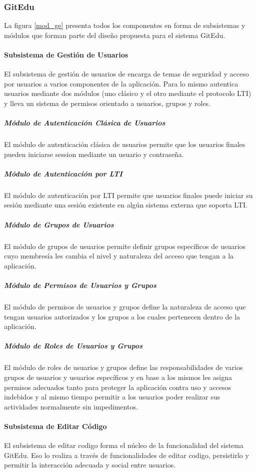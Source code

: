 \subsubsection{GitEdu}

La figura \ref{mod_ge} presenta todos los componentes en forma de subsistemas y módulos que forman parte del diseño propuesta para el sistema GitEdu.

\paragraph{Subsistema de Gestión de Usuarios}
El subsistema de gestión de usuarios de encarga de temas de seguridad y acceso por usuarios a varios componentes de la aplicación. Para lo mismo autentica usuarios mediante dos módulos (uno clásico y el otro mediante el protocolo LTI) y lleva un sistema de permisos orientado a usuarios, grupos y roles.

\subparagraph{Módulo de Autenticación Clásica de Usuarios}
El módulo de autenticación clásica de usuarios permite que los usuarios finales pueden iniciarse session mediante un usuario y contraseña.

\subparagraph{Módulo de Autenticación por LTI}
El módulo de autenticación por LTI permite que usuarios finales puede iniciar su sesión mediante una sesión existente en algún sistema externa que soporta LTI.

\subparagraph{Módulo de Grupos de Usuarios}
El módulo de grupos de usuarios permite definir grupos específicos de usuarios cuyo membresía les cambia el nivel y naturaleza del acceso que tengan a la aplicación.

\subparagraph{Módulo de Permisos de Usuarios y Grupos}
El módulo de permisos de usuarios y grupos define la naturaleza de acceso que tengan usuarios autorizados y los grupos a los cuales pertenecen dentro de la aplicación.

\subparagraph{Módulo de Roles de Usuarios y Grupos}
El módulo de roles de usuarios y grupos define las responsabilidades de varios grupos de usuarios y usuarios específicos y en base a los mismos les asigna permisos adecuados tanto para proteger la aplicación contra uso y accesos indebidos y al mismo tiempo permitir a los usuarios poder realizar sus actividades normalmente sin impedimentos.

\paragraph{Subsistema de Editar Código}
El subsistema de editar codigo forma el núcleo de la funcionalidad del sistema GitEdu. Eso lo realiza a través de funcionalidades de editar codigo, persistirlo y permitir la interacción adecuada y social entre usuarios.

